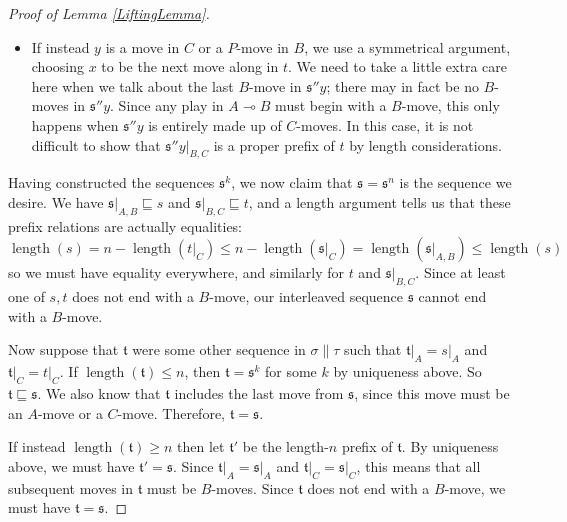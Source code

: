 \documentclass[11pt]{article} %
\theoremstyle{plain} %
\theoremstyle{definition} %
\theoremstyle{exercisestyle}
\renewcommand{\implies}{\multimap}
\newcommand{\s}{\mathfrak s}
\renewcommand{\t}{\mathfrak t}
\newcommand{\prefix}{\sqsubseteq}
\DeclareMathOperator{\length}{length}
\begin{document}
\begin{proof}[Proof of Lemma \ref{LiftingLemma}]
\begin{itemize}
      If $y$ was an $O$-move in $A$, then $y$ is a $P$-move in $A\implies B$, so it must be followed in $A\implies B$ by another move from $A$.  Then the condition that $\s''yz\vert_A\prefix s\vert_A$ tells us that $z=x$.  If instead $y$ was a $P$-move in $A$ or a move in $B$ then $y$ is an $O$-move in $A\implies B$; now, since we have $\s''y\vert_{A,B}z,\s''y\vert_{A,B}x\in\sigma$, it must be the case that $x=z$ by the definition of a strategy.

    \item If instead $y$ is a move in $C$ or a $P$-move in $B$, we use a symmetrical argument, choosing $x$ to be the next move along in $t$.  We need to take a little extra care here when we talk about the last $B$-move in $\s''y$; there may in fact be no $B$-moves in $\s''y$.  Since any play in $A\implies B$ must begin with a $B$-move, this only happens when $\s''y$ is entirely made up of $C$-moves.  In this case, it is not difficult to show that $\s''y\vert_{B,C}$ is a proper prefix of $t$ by length considerations. 
  \end{itemize}

  Having constructed the sequences $\s^k$, we now claim that $\s=\s^n$ is the sequence we desire.  We have $\s\vert_{A,B}\prefix s$ and $\s\vert_{B,C}\prefix t$, and a length argument tells us that these prefix relations are actually equalities:
  \[
    \length(s)=n-\length(t\vert_C)\le n-\length(\s\vert_C)=\length(\s\vert_{A,B})\le\length(s)
    \]
  so we must have equality everywhere, and similarly for $t$ and $\s\vert_{B,C}$.  Since at least one of $s,t$ does not end with a $B$-move, our interleaved sequence $\s$ cannot end with a $B$-move.  

  Now suppose that $\t$ were some other sequence in $\sigma\|\tau$ such that $\t\vert_A=s\vert_A$ and $\t\vert_C=t\vert_C$.  If $\length(\t)\le n$, then $\t=\s^k$ for some $k$ by uniqueness above.  So $\t\prefix\s$.  We also know that $\t$ includes the last move from $\s$, since this move must be an $A$-move or a $C$-move.  Therefore, $\t=\s$.  

  If instead $\length(\t)\ge n$ then let $\t'$ be the length-$n$ prefix of $\t$.  By uniqueness above, we must have $\t'=\s$.  Since $\t\vert_A=\s\vert_A$ and $\t\vert_C=\s\vert_C$, this means that all subsequent moves in $\t$ must be $B$-moves.  Since $\t$ does not end with a $B$-move, we must have $\t=\s$.
\end{proof}
\end{document}

